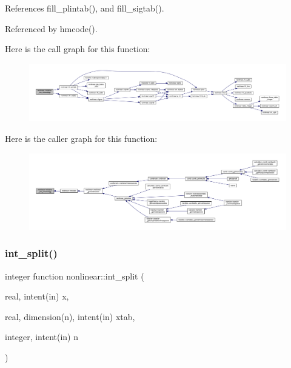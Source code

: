 References fill\+\_\+plintab(), and fill\+\_\+sigtab().



Referenced by hmcode().

Here is the call graph for this function\+:
\nopagebreak
\begin{figure}[H]
\begin{center}
\leavevmode
\includegraphics[width=350pt]{namespacenonlinear_a819e3b1efc1572f5e75eb5f2b415b4b4_cgraph}
\end{center}
\end{figure}
Here is the caller graph for this function\+:
\nopagebreak
\begin{figure}[H]
\begin{center}
\leavevmode
\includegraphics[width=350pt]{namespacenonlinear_a819e3b1efc1572f5e75eb5f2b415b4b4_icgraph}
\end{center}
\end{figure}
\mbox{\label{namespacenonlinear_a0241839029c1aa4d429fb9a516577921}} 
\subsubsection{\texorpdfstring{int\+\_\+split()}{int\_split()}}
{\footnotesize\ttfamily integer function nonlinear\+::int\+\_\+split (\begin{DoxyParamCaption}\item[{real, intent(in)}]{x,  }\item[{real, dimension(n), intent(in)}]{xtab,  }\item[{integer, intent(in)}]{n }\end{DoxyParamCaption})\hspace{0.3cm}{\ttfamily [private]}}



